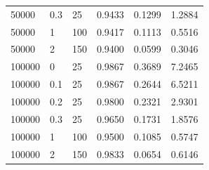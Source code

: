 \documentclass[11pt]{article}
\begin{document}
\begin{table}[htbp]
{\begin{tabular}{lll|lll}
        50000 & 0.3 & 25 & 0.9433 & 0.1299 & 1.2884 \\ 
        50000 & 1 & 100 & 0.9417 & 0.1113 & 0.5516 \\ 
        50000 & 2 & 150 & 0.9400 & 0.0599 & 0.3046 \\ 
        \midrule
        100000 & 0 & 25 & 0.9867 & 0.3689 & 7.2465 \\ 
        100000 & 0.1 & 25 & 0.9867 & 0.2644 & 6.5211 \\ 
        100000 & 0.2 & 25 & 0.9800 & 0.2321 & 2.9301 \\ 
        100000 & 0.3 & 25 & 0.9650 & 0.1731 & 1.8576 \\ 
        100000 & 1 & 100 & 0.9500 & 0.1085 & 0.5747 \\ 
        100000 & 2 & 150 & 0.9833 & 0.0654 & 0.6146 \\ 
        \bottomrule
    \end{tabular}
}
\end{table}
\end{document}
